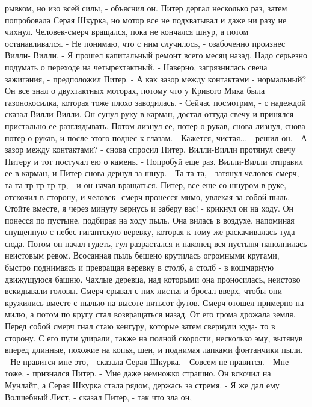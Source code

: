 рывком, но изо всей силы, - объяснил он.
    Питер дергал несколько раз, затем попробовала Серая Шкурка, но 
мотор все не подхватывал и даже ни разу не чихнул. Человек-смерч 
вращался, пока не кончался шнур, а потом останавливался.
    - Не понимаю, что с ним случилось, - озабоченно произнес Вилли-
Вилли. - Я прошел капитальный ремонт всего месяц назад. Надо серьезно 
подумать о переходе на четырехтактный.
    - Наверно, загрязнилась свеча зажигания, - предположил Питер. - А 
как зазор между контактами - нормальный?
    Он все знал о двухтактных моторах, потому что у Кривого Мика была 
газонокосилка, которая тоже плохо заводилась.
    - Сейчас посмотрим, - с надеждой сказал Вилли-Вилли.
    Он сунул руку в карман, достал оттуда свечу и принялся пристально 
ее разглядывать. Потом лизнул ее, потер о рукав, снова лизнул, снова 
потер о рукав, и после этого поднес к глазам.
    - Кажется, чистая... - решил он.
    - А зазор между контактами? - снова спросил Питер.
    Вилли-Вилли протянул свечу Питеру и тот постучал ею о камень.
    - Попробуй еще раз.
    Вилли-Вилли отправил ее в карман, и Питер снова дернул за шнур.
    - Та-та-та, - затянул человек-смерч, - та-та-тр-тр-тр-тр, - и он 
начал вращаться.
    Питер, все еще со шнуром в руке, отскочил в сторону, и человек-
смерч пронесся мимо, увлекая за собой пыль.
    - Стойте вместе, я через минуту вернусь и заберу вас! - крикнул он 
на ходу.
    Он понесся по пустыне, подбирая на ходу пыль. Она вилась в 
воздухе, напоминая спущенную с небес гигантскую веревку, которая к 
тому же раскачивалась туда-сюда.
    Потом он начал гудеть, гул разрастался и наконец вся пустыня 
наполнилась неистовым ревом. Всосанная пыль бешено крутилась огромными 
кругами, быстро поднимаясь и превращая веревку в столб, а столб - в 
кошмарную движущуюся башню. Чахлые деревца, над которыми она 
проносилась, неистово вскидывали головы. Смерч срывал с них листья и 
бросал вверх, чтобы они кружились вместе с пылью на высоте пятьсот 
футов. Смерч отошел примерно на милю, а потом по кругу стал 
возвращаться назад. От его грома дрожала земля.
    Перед собой смерч гнал стаю кенгуру, которые затем свернули куда-
то в сторону. С его пути удирали, также на полной скорости, несколько 
эму, вытянув вперед длинные, похожие на копья, шеи, и поднимая лапками 
фонтанчики пыли.
    - Не нравится мне это, - сказала Серая Шкурка. - Совсем не 
нравится.
    - Мне тоже, - признался Питер. - Мне даже немножко страшно.
    Он вскочил на Мунлайт, а Серая Шкурка стала рядом, держась за 
стремя.
    - Я же дал ему Волшебный Лист, - сказал Питер, - так что зла он, 
